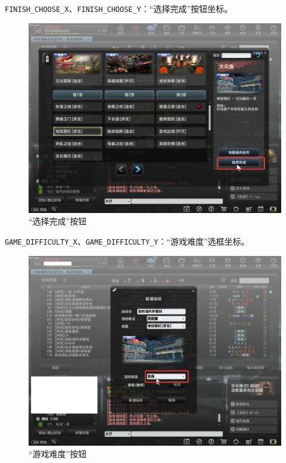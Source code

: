 \lstinline{FINISH_CHOOSE_X}、\lstinline{FINISH_CHOOSE_Y}：“选择完成”按钮坐标。

\begin{figure}[H]
    \Centering
    \includegraphics[width=\textwidth]{docs/assets/finish_choose.png}
    \caption{“选择完成”按钮}
\end{figure}

\lstinline{GAME_DIFFICULTY_X}、\lstinline{GAME_DIFFICULTY_Y}：“游戏难度”选框坐标。

\begin{figure}[H]
    \Centering
    \includegraphics[width=\textwidth]{docs/assets/choose_difficulty.png}
    \caption{“游戏难度”按钮}
\end{figure}

